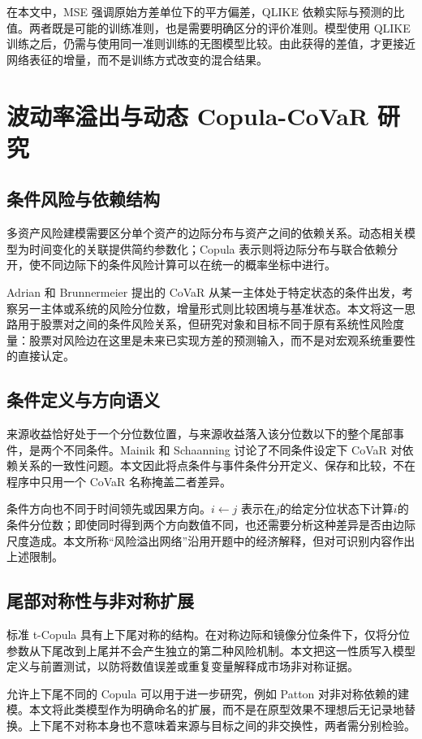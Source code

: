 在本文中，MSE 强调原始方差单位下的平方偏差，QLIKE 依赖实际与预测的比值。两者既是可能的训练准则，也是需要明确区分的评价准则。模型使用 QLIKE 训练之后，仍需与使用同一准则训练的无图模型比较。由此获得的差值，才更接近网络表征的增量，而不是训练方式改变的混合结果。

\section{波动率溢出与动态 Copula-CoVaR 研究}
\subsection{条件风险与依赖结构}
多资产风险建模需要区分单个资产的边际分布与资产之间的依赖关系。动态相关模型为时间变化的关联提供简约参数化\cite{engle2002}；Copula 表示则将边际分布与联合依赖分开，使不同边际下的条件风险计算可以在统一的概率坐标中进行。

Adrian 和 Brunnermeier 提出的 CoVaR 从某一主体处于特定状态的条件出发，考察另一主体或系统的风险分位数，增量形式则比较困境与基准状态\cite{adrian2016}。本文将这一思路用于股票对之间的条件风险关系，但研究对象和目标不同于原有系统性风险度量：股票对风险边在这里是未来已实现方差的预测输入，而不是对宏观系统重要性的直接认定。

\subsection{条件定义与方向语义}
来源收益恰好处于一个分位数位置，与来源收益落入该分位数以下的整个尾部事件，是两个不同条件。Mainik 和 Schaanning 讨论了不同条件设定下 CoVaR 对依赖关系的一致性问题\cite{mainik2012}。本文因此将点条件与事件条件分开定义、保存和比较，不在程序中只用一个 CoVaR 名称掩盖二者差异。

条件方向也不同于时间领先或因果方向。$i\leftarrow j$ 表示在$j$的给定分位状态下计算$i$的条件分位数；即使同时得到两个方向数值不同，也还需要分析这种差异是否由边际尺度造成。本文所称“风险溢出网络”沿用开题中的经济解释，但对可识别内容作出上述限制。

\subsection{尾部对称性与非对称扩展}
标准 t-Copula 具有上下尾对称的结构\cite{demarta2005}。在对称边际和镜像分位条件下，仅将分位参数从下尾改到上尾并不会产生独立的第二种风险机制。本文把这一性质写入模型定义与前置测试，以防将数值误差或重复变量解释成市场非对称证据。

允许上下尾不同的 Copula 可以用于进一步研究，例如 Patton 对非对称依赖的建模\cite{patton2006}。本文将此类模型作为明确命名的扩展，而不是在原型效果不理想后无记录地替换。上下尾不对称本身也不意味着来源与目标之间的非交换性，两者需分别检验。

